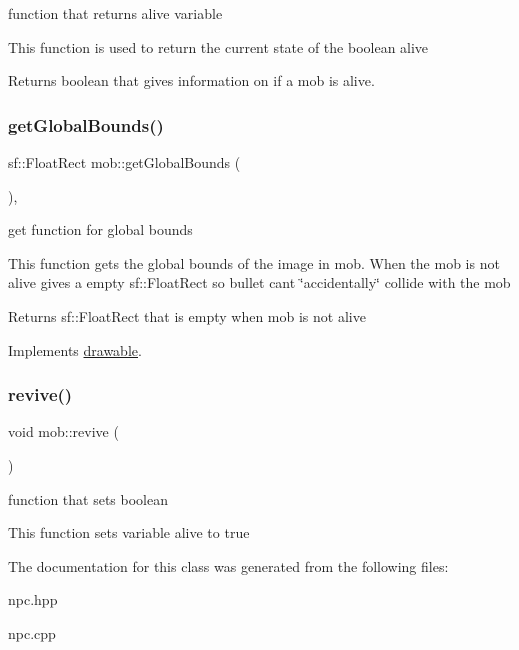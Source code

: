 function that returns alive variable 

This function is used to return the current state of the boolean alive

\begin{DoxyReturn}{Returns}
boolean that gives information on if a mob is alive. 
\end{DoxyReturn}
\mbox{\label{classmob_af3859378fad2a5f93a1c4d833ff74d5d}} 
\subsubsection{\texorpdfstring{get\+Global\+Bounds()}{getGlobalBounds()}}
{\footnotesize\ttfamily sf\+::\+Float\+Rect mob\+::get\+Global\+Bounds (\begin{DoxyParamCaption}{ }\end{DoxyParamCaption})\hspace{0.3cm}{\ttfamily [override]}, {\ttfamily [virtual]}}



get function for global bounds 

This function gets the global bounds of the image in mob. When the mob is not alive gives a empty sf\+::\+Float\+Rect so bullet can\textquotesingle{}t \char`\"{}accidentally\char`\"{} collide with the mob

\begin{DoxyReturn}{Returns}
sf\+::\+Float\+Rect that is empty when mob is not alive 
\end{DoxyReturn}


Implements \hyperlink{classdrawable_ae013ac0be47538be9ce885d6642daf73}{drawable}.

\mbox{\label{classmob_a3bce6c06653881f8be86fbc60a2b67cb}} 
\subsubsection{\texorpdfstring{revive()}{revive()}}
{\footnotesize\ttfamily void mob\+::revive (\begin{DoxyParamCaption}{ }\end{DoxyParamCaption})}



function that sets boolean 

This function sets variable alive to true 

The documentation for this class was generated from the following files\+:\begin{DoxyCompactItemize}
\item 
npc.\+hpp\item 
npc.\+cpp\end{DoxyCompactItemize}

